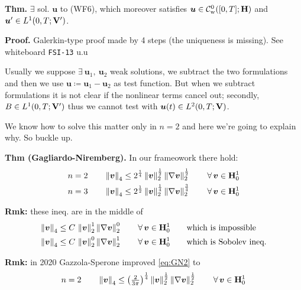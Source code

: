 \noindent\rlap{\rule[1.5ex]{0.495\textwidth}{.2pt}}


\textbf{Thm.} $\exists$ sol. $\bm u$ to (WF6), which moreover satisfies $\bm u\in\mathcal{C}^0_{\mathrm{w}}([0,T];\mathbf{H})$ and $\bm u'\in L^1(0,T;\mathbf{V}')$.

\smallskip

\textbf{\color{lavender(floral)}Proof.} Galerkin-type proof made by 4 steps (the uniqueness is missing). See whiteboard \texttt{FSI-13} u.u

\noindent\rlap{\rule[1.5ex]{0.495\textwidth}{.2pt}}


Usually we suppose $\exists\ \bm u_1,\ \bm u_2$ weak solutions, we subtract the two formulations and then we use $\bm u\coloneq \bm u_1-\bm u_2$ as test function. $\boxed{\text{But}}$  when we subtract formulations it is not clear if the nonlinear terms cancel out; secondly, $B\in L^1(0,T;\mathbf{V}')$ thus we cannot test with $\bm u(t)\in L^2(0,T;\mathbf{V})$.

\smallskip

{\color{purple} We know how to solve this matter only in $n=2$ and here we're going to explain why. So buckle up.}

\smallskip

\textbf{Thm (Gagliardo-Niremberg).} In our frameowork there hold:
\begin{align}
n=2\qquad\left\lVert \bm v \right\rVert_4 &\leq 2^{\frac{1}{4}}\left\lVert \bm v \right\rVert_2^{\frac{1}{2}}\left\lVert \nabla \bm v \right\rVert_2^{\frac{1}{2}}\qquad \forall\, \bm v \in \mathbf{H}_0^1  \label{eq:GN2} \\
n=3\qquad\left\lVert \bm v \right\rVert_4 &\leq 2^{\frac{1}{2}}\left\lVert \bm v \right\rVert_2^{\frac{1}{4}}\left\lVert \nabla \bm v \right\rVert_2^{\frac{3}{4}}\qquad \forall\, \bm v \in \mathbf{H}_0^1  \label{eq:GN3}
\end{align}

\textbf{Rmk:} these ineq. are in the middle of
\begin{align*}
\left\lVert \bm v \right\rVert_4 &\leq C\, \left\lVert \bm v \right\rVert_2^{1}\left\lVert \nabla \bm v \right\rVert_2^{0}\qquad \forall\, \bm v \in \mathbf{H}_0^1\qquad \text{which is impossible} \\
\left\lVert \bm v \right\rVert_4 &\leq C\,\left\lVert \bm v \right\rVert_2^{0}\left\lVert \nabla \bm v \right\rVert_2^{1}\qquad \forall\, \bm v \in \mathbf{H}_0^1\qquad \text{which is Sobolev ineq.}
\end{align*}

\textbf{Rmk:} in 2020 Gazzola-Sperone improved \eqref{eq:GN2} to
\begin{equation*}
n=2\qquad\left\lVert \bm v \right\rVert_4 \leq \left(\textstyle\frac{2}{3\pi}\right)^{\frac{1}{4}}\left\lVert \bm v \right\rVert_2^{\frac{1}{2}}\left\lVert \nabla \bm v \right\rVert_2^{\frac{1}{2}}\qquad \forall\, \bm v \in \mathbf{H}_0^1
\end{equation*}

